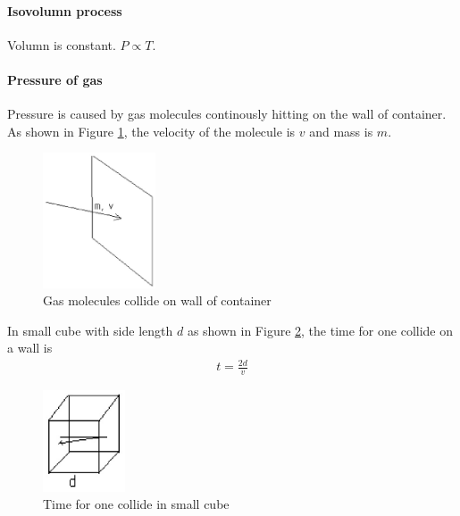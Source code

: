         \paragraph{Isovolumn process}
            Volumn is constant. $P \propto T$.

        \paragraph{Pressure of gas}
            Pressure is caused by gas molecules continously hitting on the wall of container. As shown in Figure \ref{hit_wall}, the velocity of the molecule is $v$ and mass is $m$.

            \begin{figure}[H]
                \begin{center}
                    \includegraphics[height=4cm]{thermal_charts/hit_wall.eps}
                \end{center}
                \caption{Gas molecules collide on wall of container}
                \label{hit_wall}
            \end{figure}

            In small cube with side length $d$ as shown in Figure \ref{small_cub_hit}, the time for one collide on a wall is
            \begin{align}
                t = \frac{2d}{v}
            \end{align}

            \begin{figure}[H]
                \begin{center}
                    \includegraphics[height=3cm]{thermal_charts/small_cube_collide.eps}
                \end{center}
                \caption{Time for one collide in small cube}
                \label{small_cub_hit}
            \end{figure}

